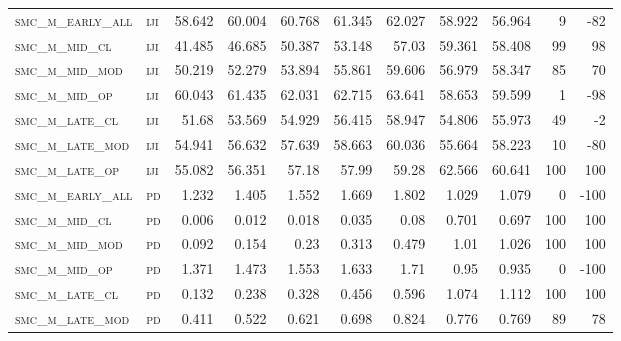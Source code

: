\begin{landscape}
\begin{center}
\begin{footnotesize}
\begin{longtable}{llrrrrrr|rrr}
\textsc{smc\_m\_early\_all} & \textsc{iji       }   & 58.642   & 60.004   & 60.768   & 61.345   & 62.027   & 58.922      & 56.964        & 9             & -82      \\
\textsc{smc\_m\_mid\_cl   } & \textsc{iji       }   & 41.485   & 46.685   & 50.387   & 53.148   & 57.03    & 59.361      & 58.408        & 99            & 98       \\
\textsc{smc\_m\_mid\_mod  } & \textsc{iji       }   & 50.219   & 52.279   & 53.894   & 55.861   & 59.606   & 56.979      & 58.347        & 85            & 70       \\
\textsc{smc\_m\_mid\_op   } & \textsc{iji       }   & 60.043   & 61.435   & 62.031   & 62.715   & 63.641   & 58.653      & 59.599        & 1             & -98      \\
\textsc{smc\_m\_late\_cl  } & \textsc{iji       }   & 51.68    & 53.569   & 54.929   & 56.415   & 58.947   & 54.806      & 55.973        & 49            & -2       \\
\textsc{smc\_m\_late\_mod } & \textsc{iji       }   & 54.941   & 56.632   & 57.639   & 58.663   & 60.036   & 55.664      & 58.223        & 10            & -80      \\
\textsc{smc\_m\_late\_op  } & \textsc{iji       }   & 55.082   & 56.351   & 57.18    & 57.99    & 59.28    & 62.566      & 60.641        & 100           & 100      \\
\textsc{smc\_m\_early\_all} & \textsc{pd        }   & 1.232    & 1.405    & 1.552    & 1.669    & 1.802    & 1.029       & 1.079         & 0             & -100     \\
\textsc{smc\_m\_mid\_cl   } & \textsc{pd        }   & 0.006    & 0.012    & 0.018    & 0.035    & 0.08     & 0.701       & 0.697         & 100           & 100      \\
\textsc{smc\_m\_mid\_mod  } & \textsc{pd        }   & 0.092    & 0.154    & 0.23     & 0.313    & 0.479    & 1.01        & 1.026         & 100           & 100      \\
\textsc{smc\_m\_mid\_op   } & \textsc{pd        }   & 1.371    & 1.473    & 1.553    & 1.633    & 1.71     & 0.95        & 0.935         & 0             & -100     \\
\textsc{smc\_m\_late\_cl  } & \textsc{pd        }   & 0.132    & 0.238    & 0.328    & 0.456    & 0.596    & 1.074       & 1.112         & 100           & 100      \\
\textsc{smc\_m\_late\_mod } & \textsc{pd        }   & 0.411    & 0.522    & 0.621    & 0.698    & 0.824    & 0.776       & 0.769         & 89            & 78       \\

\end{longtable}
\end{footnotesize}
\end{center}
\end{landscape}
